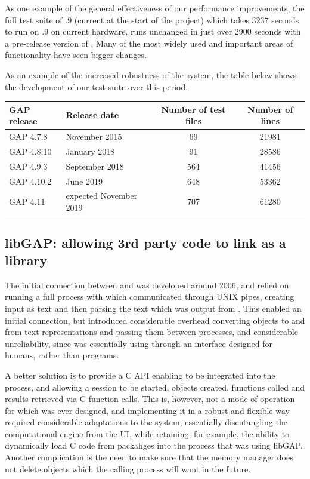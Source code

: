 \documentclass{deliverablereport}
\begin{document}
As one example of the general effectiveness of our performance
improvements, the full test suite of .9 (current at the
start of the project) which takes 3237 seconds to run on .9 on
current hardware, runs unchanged in just over 2900 seconds with a
pre-release version of . Many of the most widely used and
important areas of \GAP functionality have seen bigger changes.  


As an example of the increased robustness of the system, the table
below shows the development of our test suite over this period.

\begin{center}
\begin{tabular}{| l | l | c | c |} 
\hline
GAP release & Release date & Number of test files & Number of lines \\
\hline GAP 4.7.8  & November 2015           & 69 & 21981 \\
\hline GAP 4.8.10 & January 2018            & 91 & 28586 \\
\hline GAP 4.9.3  & September 2018          & 564 & 41456 \\
\hline GAP 4.10.2 & June 2019               & 648 & 53362 \\
\hline GAP 4.11   & expected November 2019  & 707 & 61280 \\
\hline
\end{tabular}
\end{center}

\subsection{libGAP: allowing 3rd party code to link \GAP as a library}\label{libgap}

The initial connection between \Sage and \GAP was developed around
2006, and relied on running a full \GAP process with which \Sage
communicated through UNIX pipes, creating \GAP input as text and then parsing
the text which was output from \GAP. This enabled an initial connection, but
introduced considerable overhead converting objects to and from text
representations and passing them between processes, and considerable
unreliability, since \Sage was essentially using \GAP through an
interface designed for humans, rather than programs.

A better solution is to provide a C API enabling \GAP to be integrated
into the \Sage process, and allowing a \GAP session to be started,
objects created, functions called and results retrieved via C function
calls. This is, however, not a mode of operation for which \GAP was
ever designed, and implementing it in a robust and flexible way
required considerable adaptations to the system, essentially
disentangling the computational engine from the UI, while retaining,
for example, the ability to dynamically load C code from \GAP
packahges into the process that was using libGAP. Another complication
is the need to make sure that the \GAP memory manager does not delete
objects which the calling process will want in the future.
\end{document}
